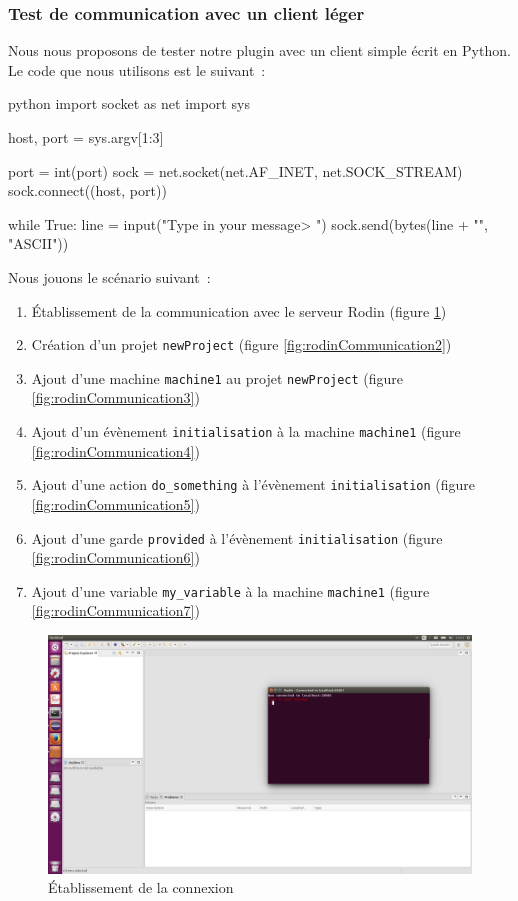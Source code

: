 \subsubsection{Test de communication avec un client léger}

Nous nous proposons de tester notre plugin avec un client simple écrit en Python.
Le code que nous utilisons est le suivant~:

\begin{imtaCode}{python}
import socket as net
import sys


host, port = sys.argv[1:3]

port = int(port)
sock = net.socket(net.AF_INET, net.SOCK_STREAM)
sock.connect((host, port))

while True:
    line = input("Type in your message\n> ")
    sock.send(bytes(line + "\n", "ASCII"))
\end{imtaCode}

Nous jouons le scénario suivant~:

\begin{enumerate}
\item Établissement de la communication avec le serveur Rodin (figure \ref{fig:rodinCommunication1})
\item Création d'un projet \texttt{newProject} (figure \ref{fig:rodinCommunication2})
\item Ajout d'une machine \texttt{machine1} au projet \texttt{newProject} (figure \ref{fig:rodinCommunication3})
\item Ajout d'un évènement \texttt{initialisation} à la machine \texttt{machine1} (figure \ref{fig:rodinCommunication4})
\item Ajout d'une action \texttt{do\_something} à l'évènement \texttt{initialisation} (figure \ref{fig:rodinCommunication5})
\item Ajout d'une garde \texttt{provided} à l'évènement \texttt{initialisation} (figure \ref{fig:rodinCommunication6})
\item Ajout d'une variable \texttt{my\_variable} à la machine \texttt{machine1} (figure \ref{fig:rodinCommunication7})
\end{enumerate}


\begin{figure}[H]
    \centering
    \includegraphics{pictures/rodinCommunication1.png}
    \caption{Établissement de la connexion}
    \label{fig:rodinCommunication1}
\end{figure}

